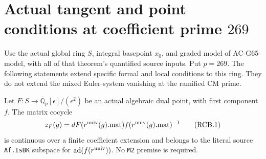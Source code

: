 \section{Actual tangent and point conditions at coefficient prime \(269\)}
\label{sec:cubic-269-model-conditions}

Use the actual global ring \(S\), integral basepoint \(x_0\),
and graded model of AC-G65-model, with all of that theorem's
quantified source inputs. Put \(p=269\). The following statements
extend specific formal and local conditions to this ring. They do
not extend the mixed Euler-system vanishing at the ramified CM prime.

\begin{proposition}
\label{AC-G66-BK}
Let \(F:S\to\overline{\mathbb Q}_p[\epsilon]/(\epsilon^2)\)
be an actual algebraic dual point, with first component \(f\).
The matrix cocycle
\[
 z_F(g)=dF(r^{\rm univ}(g).\mathrm{mat})
                 f(r^{\rm univ}(g).\mathrm{mat})^{-1}
                                                        \tag{RCB.1}
\]
is continuous over a finite coefficient extension and belongs
to the literal source \texttt{Af.IsBK} subspace for
\(\operatorname{ad}(f(r^{\rm univ}))\).
No \texttt{M2} premise is required.
\end{proposition}
